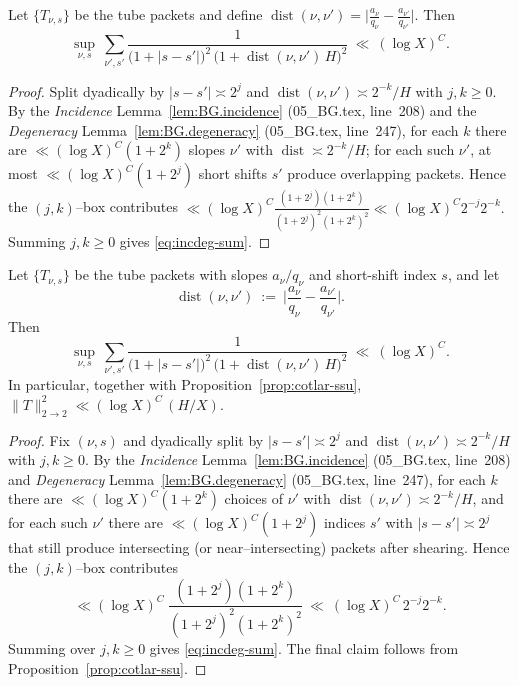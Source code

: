 \begin{lemma}\label{lem:incdeg-sawyer}
Let $\{T_{\nu,s}\}$ be the tube packets and define
\(
\operatorname{dist}(\nu,\nu')=\bigl|\frac{a_\nu}{q_\nu}-\frac{a_{\nu'}}{q_{\nu'}}\bigr|.
\)
Then
\begin{equation}\label{eq:incdeg-sum}
\sup_{\nu,s}\ \sum_{\nu',s'} \frac{1}{\big(1+|s-s'|\big)^{2}\,\big(1+\operatorname{dist}(\nu,\nu')\,H\big)^{2}}
\ \ll\ (\log X)^C.
\end{equation}
\end{lemma}

\begin{proof}
Split dyadically by $|s-s'|\asymp 2^{j}$ and $\operatorname{dist}(\nu,\nu')\asymp 2^{-k}/H$ with $j,k\ge0$.
By the \emph{Incidence} Lemma~\ref{lem:BG.incidence} (05\_BG.tex, line~208) and the \emph{Degeneracy} Lemma~\ref{lem:BG.degeneracy} (05\_BG.tex, line~247), for each $k$ there are $\ll (\log X)^C(1+2^k)$ slopes $\nu'$ with $\operatorname{dist}\asymp 2^{-k}/H$; for each such $\nu'$, at most $\ll (\log X)^C(1+2^j)$ short shifts $s'$ produce overlapping packets. Hence the $(j,k)$–box contributes
\(
\ll (\log X)^C\frac{(1+2^j)(1+2^k)}{(1+2^j)^2(1+2^k)^2}\ll (\log X)^C 2^{-j}2^{-k}.
\)
Summing $j,k\ge0$ gives \eqref{eq:incdeg-sum}.
\end{proof}

\begin{lemma}\label{lem:incdeg-sawyer}
Let $\{T_{\nu,s}\}$ be the tube packets with slopes $a_\nu/q_\nu$ and short-shift index $s$, and let
\[
\operatorname{dist}(\nu,\nu')\ :=\ \Big| \frac{a_\nu}{q_\nu}-\frac{a_{\nu'}}{q_{\nu'}}\Big|.
\]
Then
\begin{equation}\label{eq:incdeg-sum}
\sup_{\nu,s}\ \sum_{\nu',s'} \frac{1}{\big(1+|s-s'|\big)^{2}\,\big(1+\operatorname{dist}(\nu,\nu')\,H\big)^{2}}
\ \ll\ (\log X)^C.
\end{equation}
In particular, together with Proposition~\ref{prop:cotlar-ssu},
\(
\|T\|_{2\to 2}^2 \ll (\log X)^C\,(H/X).
\)
\end{lemma}

\begin{proof}
Fix $(\nu,s)$ and dyadically split by $|s-s'|\asymp 2^j$ and $\operatorname{dist}(\nu,\nu')\asymp 2^{-k}/H$ with $j,k\ge 0$. 
By the \emph{Incidence} Lemma~\ref{lem:BG.incidence} (05\_BG.tex, line~208) and \emph{Degeneracy} Lemma~\ref{lem:BG.degeneracy} (05\_BG.tex, line~247), for each $k$ there are $\ll (\log X)^C(1+2^{k})$ choices of $\nu'$ with $\operatorname{dist}(\nu,\nu')\asymp 2^{-k}/H$, and for each such $\nu'$ there are $\ll (\log X)^C(1+2^{j})$ indices $s'$ with $|s-s'|\asymp 2^j$ that still produce intersecting (or near–intersecting) packets after shearing. Hence the $(j,k)$–box contributes
\[
\ll (\log X)^C\ \frac{(1+2^j)(1+2^{k})}{(1+2^j)^2(1+2^k)^2}
\ \ll\ (\log X)^C\,2^{-j}2^{-k}.
\]
Summing over $j,k\ge 0$ gives \eqref{eq:incdeg-sum}. The final claim follows from Proposition~\ref{prop:cotlar-ssu}.
\end{proof}

